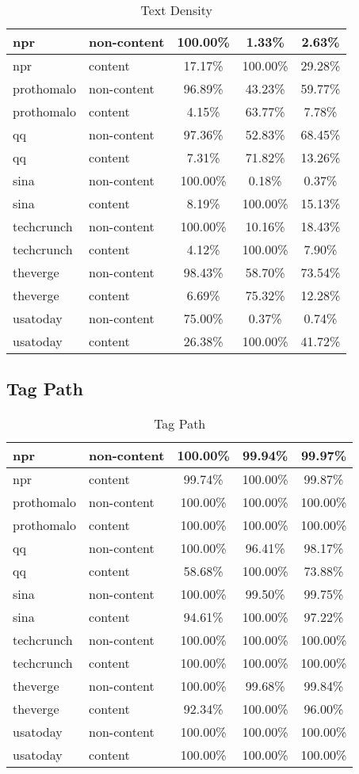 \documentclass{acm_proc_article-sp}
\begin{document}
\begin{table}
\centering
\caption{Text Density}
\begin{tabular}{|l|l|c|c|c|} \hline
npr&non-content&100.00\%&1.33\%&2.63\%\\ \hline
npr&content&17.17\%&100.00\%&29.28\%\\ \hline
prothomalo&non-content&96.89\%&43.23\%&59.77\%\\ \hline
prothomalo&content&4.15\%&63.77\%&7.78\%\\ \hline
qq&non-content&97.36\%&52.83\%&68.45\%\\ \hline
qq&content&7.31\%&71.82\%&13.26\%\\ \hline
sina&non-content&100.00\%&0.18\%&0.37\%\\ \hline
sina&content&8.19\%&100.00\%&15.13\%\\ \hline
techcrunch&non-content&100.00\%&10.16\%&18.43\%\\ \hline
techcrunch&content&4.12\%&100.00\%&7.90\%\\ \hline
theverge&non-content&98.43\%&58.70\%&73.54\%\\ \hline
theverge&content&6.69\%&75.32\%&12.28\%\\ \hline
usatoday&non-content&75.00\%&0.37\%&0.74\%\\ \hline
usatoday&content&26.38\%&100.00\%&41.72\%\\ \hline
\end{tabular}
\end{table}


\subsection{Tag Path}

\begin{table}
\centering
\caption{Tag Path}
\begin{tabular}{|l|l|c|c|c|} \hline
npr&non-content&100.00\%&99.94\%&99.97\%\\ \hline
npr&content&99.74\%&100.00\%&99.87\%\\ \hline
prothomalo&non-content&100.00\%&100.00\%&100.00\%\\ \hline
prothomalo&content&100.00\%&100.00\%&100.00\%\\ \hline
qq&non-content&100.00\%&96.41\%&98.17\%\\ \hline
qq&content&58.68\%&100.00\%&73.88\%\\ \hline
sina&non-content&100.00\%&99.50\%&99.75\%\\ \hline
sina&content&94.61\%&100.00\%&97.22\%\\ \hline
techcrunch&non-content&100.00\%&100.00\%&100.00\%\\ \hline
techcrunch&content&100.00\%&100.00\%&100.00\%\\ \hline
theverge&non-content&100.00\%&99.68\%&99.84\%\\ \hline
theverge&content&92.34\%&100.00\%&96.00\%\\ \hline
usatoday&non-content&100.00\%&100.00\%&100.00\%\\ \hline
usatoday&content&100.00\%&100.00\%&100.00\%\\ \hline
\end{tabular}
\end{table}
\end{document}

